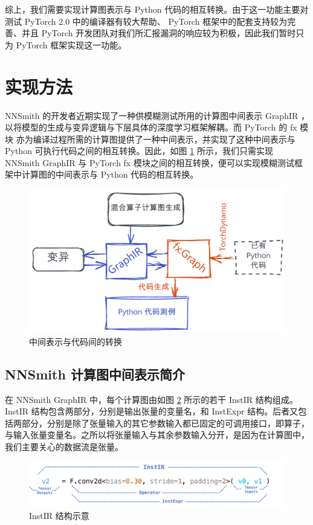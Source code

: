 综上，我们需要实现计算图表示与 Python 代码的相互转换。由于这一功能主要对测试 PyTorch 2.0 中的编译器有较大帮助、 PyTorch 框架中的配套支持较为完善、并且 PyTorch 开发团队对我们所汇报漏洞的响应较为积极，因此我们暂时只为 PyTorch 框架实现这一功能。

\section{实现方法}

NNSmith 的开发者近期实现了一种供模糊测试所用的计算图中间表示 GraphIR ，以将模型的生成与变异逻辑与下层具体的深度学习框架解耦。而 PyTorch 的 fx 模块 \cite{torch_fx} 亦为编译过程所需的计算图提供了一种中间表示，并实现了这种中间表示与 Python 可执行代码之间的相互转换。因此，如图 \ref{fig:convert} 所示，我们只需实现 NNSmith GraphIR 与 PyTorch fx 模块之间的相互转换，便可以实现模糊测试框架中计算图的中间表示与 Python 代码的相互转换。

\begin{figure}
    \centering
    \includegraphics[width=.8\linewidth]{thuthesis/figures/convert.pdf}
    \caption{中间表示与代码间的转换}
    \label{fig:convert}
\end{figure}

\subsection{NNSmith 计算图中间表示简介}

在 NNSmith GraphIR 中，每个计算图由如图 \ref{fig:instir} 所示的若干 InstIR 结构组成。 InstIR 结构包含两部分，分别是输出张量的变量名，和 InstExpr 结构。后者又包括两部分，分别是除了张量输入的其它参数输入都已固定的可调用接口，即算子，与输入张量变量名。之所以将张量输入与其余参数输入分开，是因为在计算图中，我们主要关心的数据流是张量。

\begin{figure}
    \centering
    \includegraphics[width=1.\linewidth]{thuthesis/figures/instir.pdf}
    \caption{InstIR 结构示意}
    \label{fig:instir}
\end{figure}

